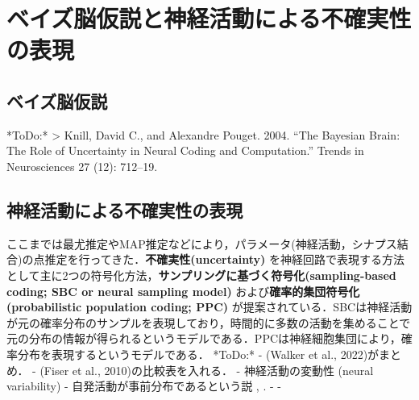 \section{ベイズ脳仮説と神経活動による不確実性の表現}\subsection{ベイズ脳仮説}*ToDo:*
> Knill, David C., and Alexandre Pouget. 2004. “The Bayesian Brain: The Role of Uncertainty in Neural Coding and Computation.” Trends in Neurosciences 27 (12): 712–19.
\subsection{神経活動による不確実性の表現}ここまでは最尤推定やMAP推定などにより，パラメータ(神経活動，シナプス結合)の点推定を行ってきた．\textbf{不確実性(uncertainty)} を神経回路で表現する方法として主に2つの符号化方法，\textbf{サンプリングに基づく符号化(sampling-based coding; SBC or neural sampling model)} および\textbf{確率的集団符号化(probabilistic population coding; PPC)} が提案されている．SBCは神経活動が元の確率分布のサンプルを表現しており，時間的に多数の活動を集めることで元の分布の情報が得られるというモデルである．PPCは神経細胞集団により，確率分布を表現するというモデルである．
*ToDo:*
- (Walker et al., 2022)がまとめ．
- (Fiser et al., 2010)の比較表を入れる．
- 神経活動の変動性 (neural variability)
- 自発活動が事前分布であるという説 \cite{Fiser2010-kw}, \cite{Berkes2011-it}.
- \cite{Hoyer2002-ci}
- \cite{Sanborn2016-en}